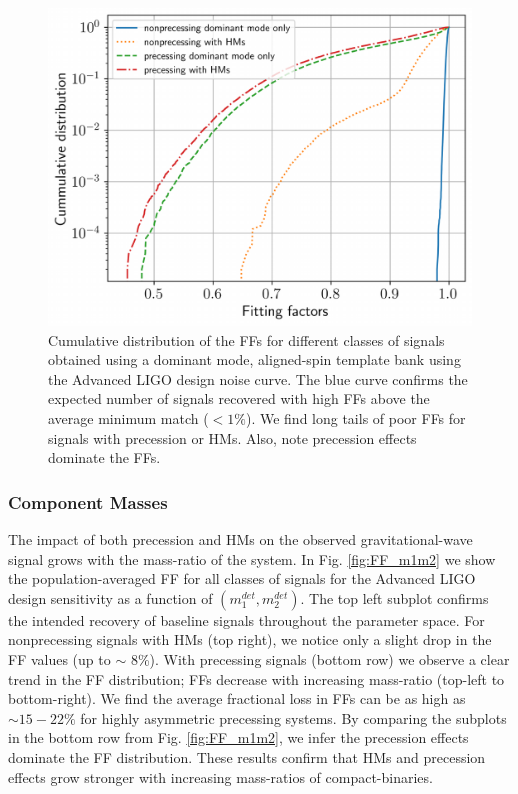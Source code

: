 \begin{figure}
    \centering
    \includegraphics[width=\linewidth]{figures/HM_and_precession/design_CDF.pdf}
    \caption{Cumulative distribution of the FFs for different classes of signals obtained using a dominant mode, aligned-spin template bank using the Advanced LIGO design noise curve. The blue curve confirms the expected number of signals recovered with high FFs above the average minimum match ($< 1\%$). We find long tails of poor FFs for signals with precession or HMs. Also, note precession effects dominate the FFs.}
    \label{fig:design_CDF}
\end{figure}

\subsubsection{Component Masses}
 The impact of both precession and HMs on the observed gravitational-wave signal grows with the mass-ratio of the system. In Fig. \ref{fig:FF_m1m2} we show the population-averaged FF for all classes of signals for the Advanced LIGO design sensitivity as a function of $(m_1^{det}, m_2^{det})$. The top left subplot confirms the intended recovery of baseline signals throughout the parameter space. For nonprecessing signals with HMs (top right), we notice only a slight drop in the FF values (up to $\sim$ 8\%). With precessing signals (bottom row) we observe a clear trend in the FF distribution; FFs decrease with increasing mass-ratio (top-left to bottom-right). We find the average fractional loss in FFs can be as high as $\sim 15 - 22\%$ for highly asymmetric precessing systems. By comparing the subplots in the bottom row from Fig. \ref{fig:FF_m1m2}, we infer the precession effects dominate the FF distribution. These results confirm that HMs and precession effects grow stronger with increasing mass-ratios of compact-binaries.

